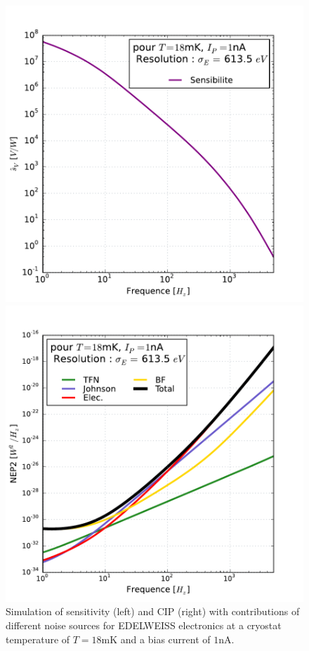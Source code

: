 \begin{figure}[!ht]
\begin{minipage}{0.49\textwidth}
\includegraphics[width=\textwidth]{Images/sv_fin.pdf}
\end{minipage}
\hfill
\begin{minipage}{0.49\textwidth}
\includegraphics[width=\textwidth]{Images/nep_fin.pdf}
\end{minipage}
\caption{Simulation of sensitivity (left) and CIP (right) with contributions of different noise sources for EDELWEISS electronics at a cryostat temperature of $T=18$mK and a bias current of $1$nA.}
\label{nep-fig}
\end{figure}

